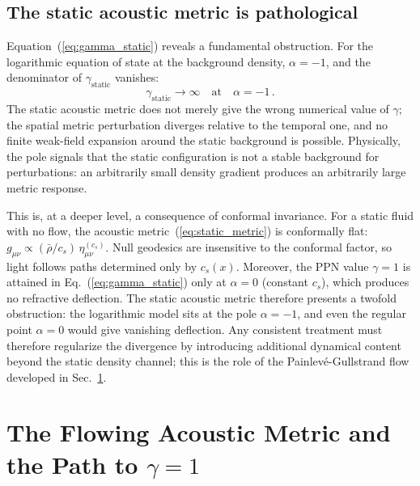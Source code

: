\documentclass[12pt, a4paper]{article}
\begin{document}
\subsection{The static acoustic metric is pathological}

Equation~(\ref{eq:gamma_static}) reveals a fundamental obstruction. For the logarithmic equation of state at the background density, $\alpha = -1$, and the denominator of $\gamma_{\mathrm{static}}$ vanishes:
\begin{equation}
    \gamma_{\mathrm{static}} \to \infty \quad\text{at}\quad \alpha = -1\,.
\label{eq:gamma_pathology}
\end{equation}
The static acoustic metric does not merely give the wrong numerical value of $\gamma$; the spatial metric perturbation diverges relative to the temporal one, and no finite weak-field expansion around the static background is possible. Physically, the pole signals that the static configuration is not a stable background for perturbations: an arbitrarily small density gradient produces an arbitrarily large metric response.

This is, at a deeper level, a consequence of conformal invariance. For a static fluid with no flow, the acoustic metric~(\ref{eq:static_metric}) is conformally flat: $g_{\mu\nu} \propto (\bar{\rho}/c_s)\,\eta_{\mu\nu}^{(c_s)}$. Null geodesics are insensitive to the conformal factor, so light follows paths determined only by $c_s(x)$. Moreover, the PPN value $\gamma = 1$ is attained in Eq.~(\ref{eq:gamma_static}) only at $\alpha = 0$ (constant $c_s$), which produces no refractive deflection. The static acoustic metric therefore presents a twofold obstruction: the logarithmic model sits at the pole $\alpha = -1$, and even the regular point $\alpha = 0$ would give vanishing deflection. Any consistent treatment must therefore regularize the divergence by introducing additional dynamical content beyond the static density channel; this is the role of the Painlev\'{e}-Gullstrand flow developed in Sec.~\ref{sec:flowing}.


\newpage
\section{The Flowing Acoustic Metric and the Path to \texorpdfstring{$\gamma = 1$}{gamma = 1}}
\label{sec:flowing}
\end{document}
